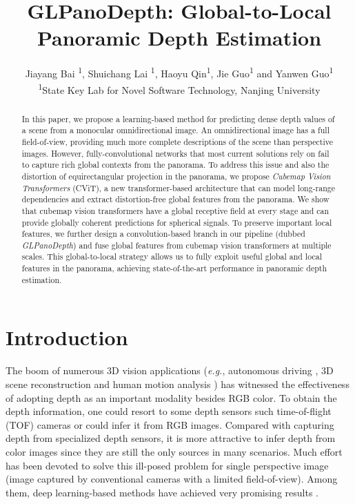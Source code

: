 \documentclass[10pt,twocolumn,letterpaper]{article}
\begin{document}
\title{GLPanoDepth: Global-to-Local Panoramic Depth Estimation}




\author{Jiayang Bai \textsuperscript{\rm 1}, Shuichang Lai \textsuperscript{\rm 1}, Haoyu Qin\textsuperscript{\rm 1}, Jie Guo\textsuperscript{\rm 1}\textsuperscript{} and Yanwen Guo\textsuperscript{\rm 1}\textsuperscript{}\\
\textsuperscript{\rm 1}State Key Lab for Novel Software Technology, Nanjing University
}


\maketitle

\begin{abstract}
In this paper, we propose a learning-based method for predicting dense depth values of a scene from a monocular omnidirectional image. An omnidirectional image has a full field-of-view, providing much more complete descriptions of the scene than perspective images. However, fully-convolutional networks that most current solutions rely on fail to capture rich global contexts from the panorama. To address this issue and also the distortion of equirectangular projection in the panorama, we propose \emph{Cubemap Vision Transformers} (CViT), a new transformer-based architecture that can model long-range dependencies and extract distortion-free global features from the panorama. We show that cubemap vision transformers have a global receptive field at every stage and can provide globally coherent predictions for spherical signals. To preserve important local features, we further design a convolution-based branch in our pipeline (dubbed \emph{GLPanoDepth}) and fuse global features from cubemap vision transformers at multiple scales. This global-to-local strategy allows us to fully exploit useful global and local features in the panorama, achieving state-of-the-art performance in panoramic depth estimation.
\end{abstract}

\section{Introduction}
The boom of numerous 3D vision applications (\emph{e.g.}, autonomous driving \cite{8025618,8100178,9197319}, 3D scene reconstruction \cite{https://doi.org/10.1111/cgf.13386,https://doi.org/10.1111/cgf.14021} and human motion analysis \cite{CHEN20131995}) has witnessed the effectiveness of adopting depth as an important modality besides RGB color. To obtain the depth information, one could resort to some depth sensors such time-of-flight (TOF) cameras or could infer it from RGB images. Compared with capturing depth from specialized depth sensors, it is more attractive to infer depth from color images since they are still the only sources in many scenarios. Much effort has been devoted to solve this ill-posed problem for single perspective image (image captured by conventional cameras with a limited field-of-view). Among them, deep learning-based methods have achieved very promising results \cite{DBLP:journals/corr/abs-1906-06113,s20082272,MING202114}. 
\end{document}
